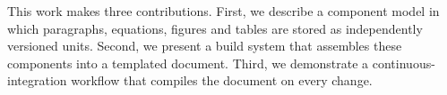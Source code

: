 This work makes three contributions. First, we describe a component
model in which paragraphs, equations, figures and tables are stored as
independently versioned units. Second, we present a build system that
assembles these components into a templated document. Third, we
demonstrate a continuous-integration workflow that compiles the document
on every change.
